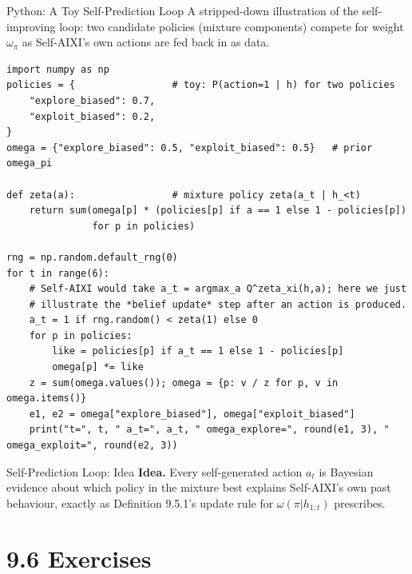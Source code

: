 \documentclass[aspectratio=169,10pt]{beamer}
\begin{document}
\begin{frame}[fragile]{Python: A Toy Self-Prediction Loop}
  A stripped-down illustration of the self-improving loop: two candidate
  policies (mixture components) compete for weight $\omega_\pi$ as
  Self-AIXI's own actions are fed back in as data.
  \begin{lstlisting}[style=pycode]
import numpy as np
policies = {                 # toy: P(action=1 | h) for two policies
    "explore_biased": 0.7,
    "exploit_biased": 0.2,
}
omega = {"explore_biased": 0.5, "exploit_biased": 0.5}   # prior omega_pi

def zeta(a):                 # mixture policy zeta(a_t | h_<t)
    return sum(omega[p] * (policies[p] if a == 1 else 1 - policies[p])
               for p in policies)

rng = np.random.default_rng(0)
for t in range(6):
    # Self-AIXI would take a_t = argmax_a Q^zeta_xi(h,a); here we just
    # illustrate the *belief update* step after an action is produced.
    a_t = 1 if rng.random() < zeta(1) else 0
    for p in policies:
        like = policies[p] if a_t == 1 else 1 - policies[p]
        omega[p] *= like
    z = sum(omega.values()); omega = {p: v / z for p, v in omega.items()}
    e1, e2 = omega["explore_biased"], omega["exploit_biased"]
    print("t=", t, " a_t=", a_t, " omega_explore=", round(e1, 3), " omega_exploit=", round(e2, 3))
  \end{lstlisting}
\end{frame}

\begin{frame}{Self-Prediction Loop: Idea}
  \textbf{Idea.} Every self-generated action $a_t$ is Bayesian evidence
  about which policy in the mixture best explains Self-AIXI's own past
  behaviour, exactly as Definition 9.5.1's update rule for
  $\omega(\pi|h_{1:t})$ prescribes.
\end{frame}

\section{9.6 Exercises}
\end{document}

